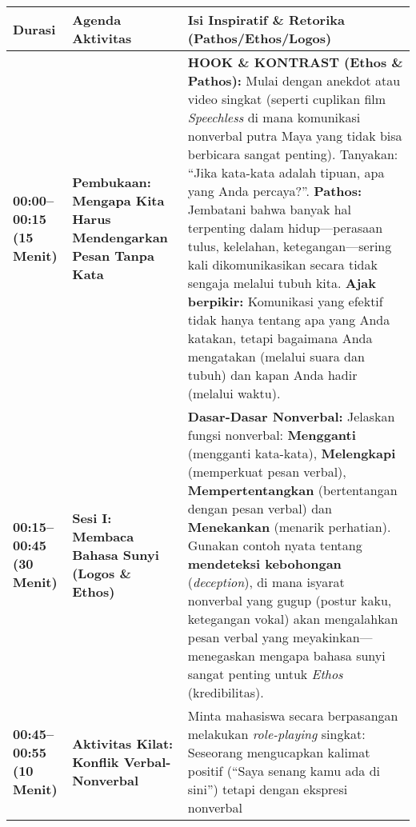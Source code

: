 \documentclass[
  letterpaper,
  DIV=11,
  numbers=noendperiod]{scrreprt}
\begin{document}
\begin{longtable}[]{@{}
  >{\centering\arraybackslash}p{}
  >{\raggedright\arraybackslash}p{}
  >{\raggedright\arraybackslash}p{}@{}}
\toprule\noalign{}
\begin{minipage}[b]{\linewidth}\centering
Durasi
\end{minipage} & \begin{minipage}[b]{\linewidth}\raggedright
Agenda Aktivitas
\end{minipage} & \begin{minipage}[b]{\linewidth}\raggedright
Isi Inspiratif \& Retorika (Pathos/Ethos/Logos)
\end{minipage} \\
\midrule\noalign{}
\endhead
\bottomrule\noalign{}
\endlastfoot
\textbf{00:00--00:15 (15 Menit)} & \textbf{Pembukaan: Mengapa Kita Harus
Mendengarkan Pesan Tanpa Kata} & \textbf{HOOK \& KONTRAST (Ethos \&
Pathos):} Mulai dengan anekdot atau video singkat (seperti cuplikan film
\emph{Speechless} di mana komunikasi nonverbal putra Maya yang tidak
bisa berbicara sangat penting). Tanyakan: ``Jika kata-kata adalah
tipuan, apa yang Anda percaya?''. \textbf{Pathos:} Jembatani bahwa
banyak hal terpenting dalam hidup---perasaan tulus, kelelahan,
ketegangan---sering kali dikomunikasikan secara tidak sengaja melalui
tubuh kita. \textbf{Ajak berpikir:} Komunikasi yang efektif tidak hanya
tentang apa yang Anda katakan, tetapi bagaimana Anda mengatakan (melalui
suara dan tubuh) dan kapan Anda hadir (melalui waktu). \\
\textbf{00:15--00:45 (30 Menit)} & \textbf{Sesi I: Membaca Bahasa Sunyi
(Logos \& Ethos)} & \textbf{Dasar-Dasar Nonverbal:} Jelaskan fungsi
nonverbal: \textbf{Mengganti} (mengganti kata-kata), \textbf{Melengkapi}
(memperkuat pesan verbal), \textbf{Mempertentangkan} (bertentangan
dengan pesan verbal) dan \textbf{Menekankan} (menarik perhatian).
Gunakan contoh nyata tentang \textbf{mendeteksi kebohongan}
(\emph{deception}), di mana isyarat nonverbal yang gugup (postur kaku,
ketegangan vokal) akan mengalahkan pesan verbal yang
meyakinkan---menegaskan mengapa bahasa sunyi sangat penting untuk
\emph{Ethos} (kredibilitas). \\
\textbf{00:45--00:55 (10 Menit)} & \textbf{Aktivitas Kilat: Konflik
Verbal-Nonverbal} & Minta mahasiswa secara berpasangan melakukan
\emph{role-playing} singkat: Seseorang mengucapkan kalimat positif
(``Saya senang kamu ada di sini'') tetapi dengan ekspresi nonverbal

\end{longtable}
\end{document}
